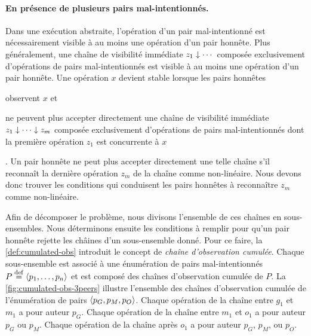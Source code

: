 \paragraph{En présence de plusieurs pairs mal-intentionnés.}
Dans une exécution abstraite, l'opération d'un pair mal-intentionné est nécessairement visible à au moins une opération d'un pair honnête.
Plus généralement, une chaîne de visibilité immédiate $z_1 \idr \dotsb$ composée exclusivement d'opérations de pairs mal-intentionnés est visible à au moins une opération d'un pair honnête.
Une opération $x$ devient stable lorsque les pairs honnêtes \begin{inlinelist}
    \item observent $x$ et
    \item ne peuvent plus accepter directement une chaîne de visibilité immédiate $z_1 \idr \dotsb \idr z_m$ composée exclusivement d'opérations de pairs mal-intentionnés dont la première opération $z_1$ est concurrente à $x$
\end{inlinelist}.
Un pair honnête ne peut plus accepter directement une telle chaîne s'il reconnaît la dernière opération $z_m$ de la chaîne comme non-linéaire.
Nous devons donc trouver les conditions qui conduisent les pairs honnêtes à reconnaître $z_m$ comme non-linéaire.

Afin de décomposer le problème, nous divisons l'ensemble de ces chaînes en sous-ensembles.
Nous déterminons ensuite les conditions à remplir pour qu'un pair honnête rejette les châines d'un sous-ensemble donné.
Pour ce faire, la \autoref{def:cumulated-obs} introduit le concept de \emph{chaîne d'observation cumulée}.
Chaque sous-ensemble est associé à une énumération de pairs mal-intentionnés $P \defeq \tuple*{p_1, \dotsc, p_n}$ et est composé des chaînes d'observation cumulée de $P$.
La \autoref{fig:cumulated-obs-3peers} illustre l'ensemble des chaînes d'observation cumulée de l'énumération de pairs $\tuple*{p_G, p_M, p_O}$.
Chaque opération de la chaîne entre $g_1$ et $m_1$ a pour auteur $p_G$.
Chaque opération de la chaîne entre $m_1$ et $o_1$ a pour auteur $p_G$ ou $p_M$.
Chaque opération de la chaîne après $o_1$ a pour auteur $p_G$, $p_M$, ou $p_O$.


